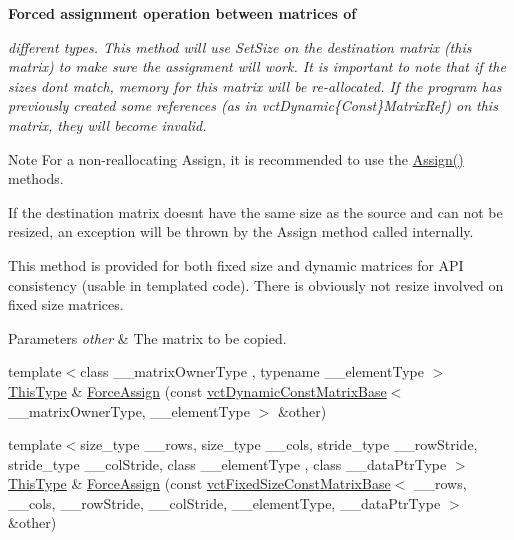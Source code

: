 \begin{Indent}{\bf Forced assignment operation between matrices of}\par
{\em different types. This method will use Set\+Size on the destination matrix (this matrix) to make sure the assignment will work. It is important to note that if the sizes don\textquotesingle{}t match, memory for this matrix will be re-\/allocated. If the program has previously created some references (as in vct\+Dynamic\{Const\}Matrix\+Ref) on this matrix, they will become invalid.

\begin{DoxyNote}{Note}
For a non-\/reallocating Assign, it is recommended to use the \hyperlink{classvct_dynamic_matrix_base_a2f080a67dc52e906f0219bbc924febbc}{Assign()} methods.

If the destination matrix doesn\textquotesingle{}t have the same size as the source and can not be resized, an exception will be thrown by the Assign method called internally.

This method is provided for both fixed size and dynamic matrices for A\+P\+I consistency (usable in templated code). There is obviously not resize involved on fixed size matrices.
\end{DoxyNote}

\begin{DoxyParams}{Parameters}
{\em other} & The matrix to be copied. \\
\hline
\end{DoxyParams}
}\begin{DoxyCompactItemize}
\item 
{\footnotesize template$<$class \+\_\+\+\_\+matrix\+Owner\+Type , typename \+\_\+\+\_\+element\+Type $>$ }\\\hyperlink{classvct_dynamic_const_matrix_base_ac4ff48cbe4d9de3fdef5a02447ffb9db}{This\+Type} \& \hyperlink{classvct_dynamic_matrix_base_ab29e3da9a500707dc89a48f1b85d8aec}{Force\+Assign} (const \hyperlink{classvct_dynamic_const_matrix_base}{vct\+Dynamic\+Const\+Matrix\+Base}$<$ \+\_\+\+\_\+matrix\+Owner\+Type, \+\_\+\+\_\+element\+Type $>$ \&other)
\item 
{\footnotesize template$<$size\+\_\+type \+\_\+\+\_\+rows, size\+\_\+type \+\_\+\+\_\+cols, stride\+\_\+type \+\_\+\+\_\+row\+Stride, stride\+\_\+type \+\_\+\+\_\+col\+Stride, class \+\_\+\+\_\+element\+Type , class \+\_\+\+\_\+data\+Ptr\+Type $>$ }\\\hyperlink{classvct_dynamic_const_matrix_base_ac4ff48cbe4d9de3fdef5a02447ffb9db}{This\+Type} \& \hyperlink{classvct_dynamic_matrix_base_aed7c5ada42a3f300ca14684df76cb6fc}{Force\+Assign} (const \hyperlink{classvct_fixed_size_const_matrix_base}{vct\+Fixed\+Size\+Const\+Matrix\+Base}$<$ \+\_\+\+\_\+rows, \+\_\+\+\_\+cols, \+\_\+\+\_\+row\+Stride, \+\_\+\+\_\+col\+Stride, \+\_\+\+\_\+element\+Type, \+\_\+\+\_\+data\+Ptr\+Type $>$ \&other)
\end{DoxyCompactItemize}
\end{Indent}
